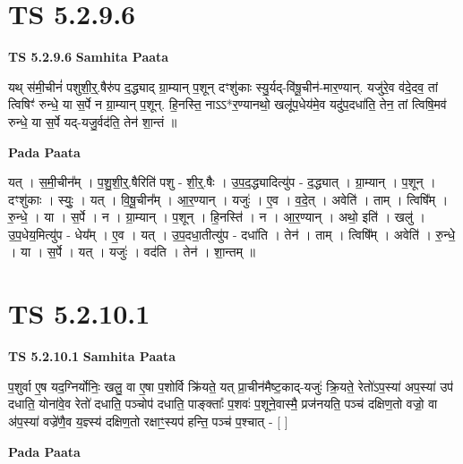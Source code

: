 \documentclass[17pt]{extarticle}
\begin{document}

\section{ TS 5.2.9.6 }

\textbf{TS 5.2.9.6 } \newline
\textbf{Samhita Paata} \newline

यथ् स॑मी॒चीनं॑ पशुशी॒र्॒.षैरु॑प द॒द्ध्याद् ग्रा॒म्यान् प॒शून् दꣳशु॑काः स्यु॒र्यद्-वि॑षू॒चीन॑-मार॒ण्यान्. यजु॑रे॒व व॑दे॒दव॒ तां त्विषिꣳ॑ रुन्धे॒ या स॒र्पे न ग्रा॒म्यान् प॒शून्. हि॒नस्ति॒ नाऽऽ*र॒ण्यानथो॒ खलू॑प॒धेय॑मे॒व यदु॑प॒दधा॑ति॒ तेन॒ तां त्विषि॒मव॑ रुन्धे॒ या स॒र्पे यद्-यजु॒र्वद॑ति॒ तेन॑ शा॒न्तं ॥ \newline

\textbf{Pada Paata} \newline

यत् । स॒मी॒चीन᳚म् । प॒शु॒शी॒र्॒.षैरिति॑ पशु - शी॒र्॒.षैः । उ॒प॒द॒द्ध्यादित्यु॑प - द॒द्ध्यात् । ग्रा॒म्यान् । प॒शून् । दꣳशु॑काः । स्युः॒ । यत् । वि॒षू॒चीन᳚म् । आ॒र॒ण्यान् । यजुः॑ । ए॒व । व॒दे॒त् । अवेति॑ । ताम् । त्विषि᳚म् । रु॒न्धे॒ । या । स॒र्पे । न । ग्रा॒म्यान् । प॒शून् । हि॒नस्ति॑ । न । आ॒र॒ण्यान् । अथो॒ इति॑ । खलु॑ । उ॒प॒धेय॒मित्यु॑प - धेय᳚म् । ए॒व । यत् । उ॒प॒दधा॒तीत्यु॑प - दधा॑ति । तेन॑ । ताम् । त्विषि᳚म् । अवेति॑ । रु॒न्धे॒ । या । स॒र्पे । यत् । यजुः॑ । वद॑ति । तेन॑ । शा॒न्तम् ॥  \newline





\section{ TS 5.2.10.1 }

\textbf{TS 5.2.10.1 } \newline
\textbf{Samhita Paata} \newline

प॒शुर्वा ए॒ष यद॒ग्निर्योनिः॒ खलु॒ वा ए॒षा प॒शोर्वि क्रि॑यते॒ यत् प्रा॒चीन॑मैष्ट॒काद्-यजुः॑ क्रि॒यते॒ रेतो॑ऽप॒स्या॑ अप॒स्या॑ उप॑ दधाति॒ योना॑वे॒व रेतो॑ दधाति॒ पञ्चोप॑ दधाति॒ पाङ्क्ताः᳚ प॒शवः॑ प॒शूने॒वास्मै॒ प्रज॑नयति॒ पञ्च॑ दक्षिण॒तो वज्रो॒ वा अ॑प॒स्या॑ वज्रे॑णै॒व य॒ज्ञ्स्य॑ दक्षिण॒तो रक्षाꣳ॒॒स्यप॑ हन्ति॒ पञ्च॑ प॒श्चात् - [  ] \newline

\textbf{Pada Paata} \newline
\end{document}
